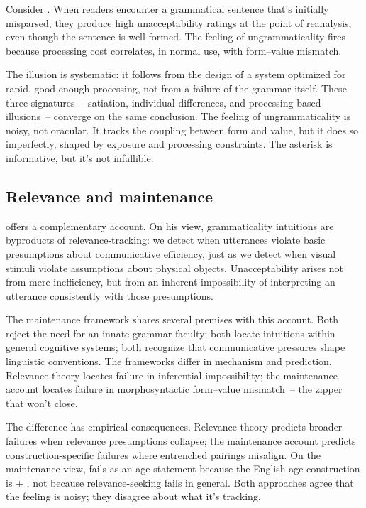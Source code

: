 Consider . When readers encounter a grammatical sentence that's initially misparsed, they produce high unacceptability ratings at the point of reanalysis, even though the sentence is well-formed. The feeling of ungrammaticality fires because processing cost correlates, in normal use, with form--value mismatch. 

The illusion is systematic: it follows from the design of a system optimized for rapid, good-enough processing, not from a failure of the grammar itself. These three signatures~-- satiation, individual differences, and processing-based illusions~-- converge on the same conclusion. The feeling of ungrammaticality is noisy, not oracular. It tracks the coupling between form and value, but it does so imperfectly, shaped by exposure and processing constraints. The asterisk is informative, but it's not infallible.


\subsection{Relevance and maintenance}
\label{sec:14:relevance}

\textcite{scottphillips2024communication} offers a complementary account. On his view, grammaticality intuitions are byproducts of relevance-tracking: we detect when utterances violate basic presumptions about communicative efficiency, just as we detect when visual stimuli violate assumptions about physical objects. Unacceptability arises not from mere inefficiency, but from an inherent impossibility of interpreting an utterance consistently with those presumptions.

The maintenance framework shares several premises with this account. Both reject the need for an innate grammar faculty; both locate intuitions within general cognitive systems; both recognize that communicative pressures shape linguistic conventions. The frameworks differ in mechanism and prediction. Relevance theory locates failure in inferential impossibility; the maintenance account locates failure in morphosyntactic form--value mismatch~-- the zipper that won't close.

The difference has empirical consequences. Relevance theory predicts broader failures when relevance presumptions collapse; the maintenance account predicts construction-specific failures where entrenched pairings misalign. On the maintenance view, \ungram{} fails as an age statement because the English age construction is  + , not because relevance-seeking fails in general. Both approaches agree that the feeling is noisy; they disagree about what it's tracking.

